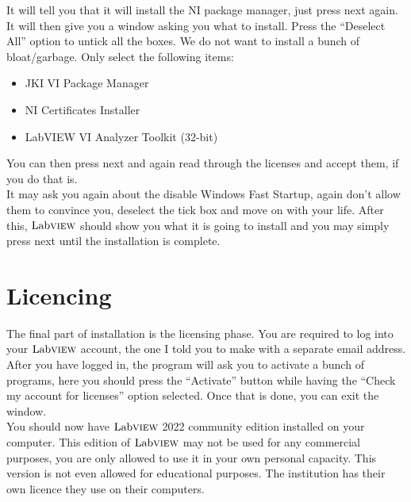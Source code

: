 It will tell you that it will install the NI package manager, just press next again. It will then give you a window asking you what to install. Press the ``Deselect All'' option to untick all the boxes. We do not want to install a bunch of bloat/garbage. Only select the following items:
\begin{itemize}
	\item JKI VI Package Manager
	\item NI Certificates Installer
	\item LabVIEW VI Analyzer Toolkit (32-bit)
\end{itemize}
You can then press next and again read through the licenses and accept them, if you do that is.\\

It may ask you again about the disable Windows Fast Startup, again don't allow them to convince you, deselect the tick box and move on with your life. After this, $\text{Lab}\textsc{view}$ should show you what it is going to install and you may simply press next until the installation is complete.
\section{Licencing}
The final part of installation is the licensing phase. You are required to log into your $\text{Lab}\textsc{view}$ account, the one I told you to make with a separate email address. After you have logged in, the program will ask you to activate a bunch of programs, here you should press the ``Activate'' button while having the ``Check my account for licenses'' option selected. Once that is done, you can exit the window.\\

You should now have $\text{Lab}\textsc{view}$ 2022 community edition installed on your computer. This edition of $\text{Lab}\textsc{view}$ may not be used for any commercial purposes, you are only allowed to use it in your own personal capacity. This version is not even allowed for educational purposes. The institution has their own licence they use on their computers.

